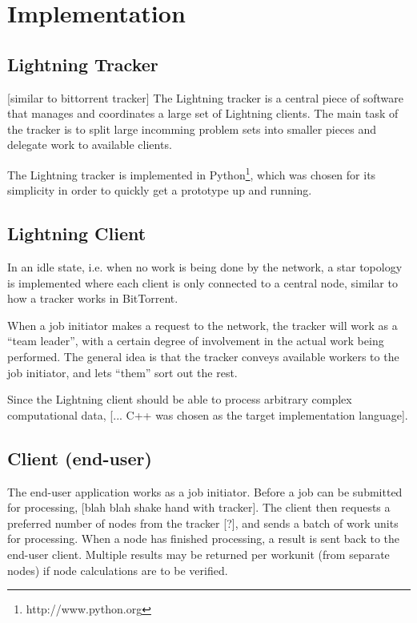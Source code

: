 \chapter{Implementation}
 
\section{Lightning Tracker}
[similar to bittorrent tracker]
The Lightning tracker is a central piece of software that manages and coordinates a large set
of Lightning clients. The main task of the tracker is to split large incomming problem sets into smaller pieces and delegate work to available clients.

The Lightning tracker is implemented in Python\footnote{http://www.python.org}, which was chosen for its simplicity in order to quickly get a prototype up and running.

\section{Lightning Client}
In an idle state, i.e. when no work is being done by the network, a star topology is implemented where each client is only connected to a central node, similar to how a tracker works in BitTorrent.

When a job initiator makes a request to the network, the tracker will work as a “team leader”,  with a certain degree of involvement in the actual work being performed. The general idea is that the tracker conveys available workers to the job initiator, and lets “them” sort out the rest.


Since the Lightning client should be able to process arbitrary complex computational data, [... C++ was chosen as the target implementation language].

\section{Client (end-user)}
The end-user application works as a job initiator. Before a job can be submitted for processing, [blah blah shake hand with tracker]. The client then requests a preferred number of nodes from the tracker [?], and sends a batch of work units for processing. When a node has finished processing, a result is sent back to the end-user client. Multiple results may be returned per workunit (from separate nodes) if node calculations are to be verified.
